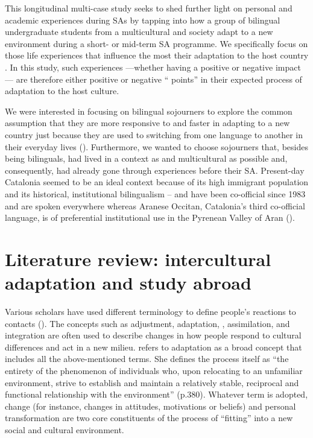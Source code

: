 \documentclass[output=paper]{langsci/langscibook}
\begin{document}
This longitudinal multi-case study seeks to shed further light on personal and academic experiences during SAs by tapping into how a group of bilingual undergraduate students from a multicultural and  society adapt to a new environment during a short- or mid-term SA programme.   We specifically focus on those life experiences that influence the most their adaptation to the host country \cite{Bennett1993}. In this study, such experiences —whether having a positive or negative impact— are therefore either positive or negative “ points” in their expected process of adaptation to the host culture.

We were interested in focusing on bilingual sojourners to explore the common assumption that they are more responsive to and faster in adapting to a new country just because they are used to switching from one language to another in their everyday lives (\citealt{Bialystok2001,VedderVirta2005}). Furthermore, we wanted to choose sojourners that, besides being bilinguals, had lived in a context as  and multicultural as possible and, consequently, had already gone through  experiences before their SA. Present-day Catalonia seemed to be an ideal context because of its high immigrant population and its historical, institutional bilingualism –  and  have been co-official since 1983 and are spoken everywhere whereas Aranese Occitan, Catalonia’s third co-official language, is of preferential institutional use in the Pyrenean Valley of Aran (\citealt{NewmanEtAl2008,Trenchs-PareraNewman2015}).


\section{Literature review: intercultural adaptation and study abroad}\label{sec:pogorelova:2}

Various scholars have used different terminology to define people’s reactions to  contacts (\citealt{Berry1997,Ward2004,MasgoretWard2006}). The concepts such as adjustment, adaptation, , assimilation, and integration are often used to describe changes in how people respond to cultural differences and act in a new milieu. \citet{Kim2005} refers to adaptation as a broad concept that includes all the above-mentioned terms. She defines the process itself as “the entirety of the phenomenon of individuals who, upon relocating to an unfamiliar  environment, strive to establish and maintain a relatively stable, reciprocal and functional relationship with the environment” (p.380). Whatever term is adopted, change (for instance, changes in attitudes, motivations or beliefs) and personal transformation are two core constituents of the process of “fitting” into a new social and cultural environment.
\end{document}
